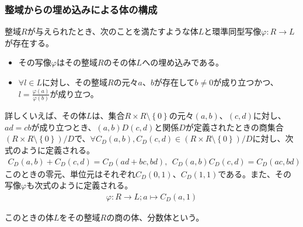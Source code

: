 \documentclass[dvipdfmx]{jsarticle}
\begin{document}
\subsubsection{整域からの埋め込みによる体の構成}%
\begin{thm}\label{3.3.2.33}
整域$R$が与えられたとき、次のことを満たすような体$L$と環準同型写像$\varphi:R \rightarrow L$が存在する。
\begin{itemize}
\item
  その写像$\varphi$はその整域$R$のその体$L$への埋め込みである。
\item
  $\forall l \in L$に対し、その整域$R$の元々$a$、$b$が存在して$b \neq 0$が成り立つかつ、$l = \frac{\varphi(a)}{\varphi(b)}$が成り立つ。
\end{itemize}\par
詳しくいえば、その体$L$は、集合$R \times R \setminus \left\{ 0 \right\}$の元々$\left( a,b \right)$、$\left( c,d \right)$に対し、$ad = cb$が成り立つとき、$\left( a,b \right)D\left( c,d \right)$と関係$D$が定義されたときの商集合${\left( R \times R \setminus \left\{ 0 \right\} \right)}/{D}$で、$\forall C_{D}(a,b),C_{D}(c,d) \in {\left( R \times R \setminus \left\{ 0 \right\} \right)}/{D}$に対し、次式のように定義される。
\begin{align*}
C_{D}(a,b) + C_{D}(c,d) = C_{D}(ad + bc,bd),\ \ C_{D}(a,b)C_{D}(c,d) = C_{D}(ac,bd)
\end{align*}
このときの零元、単位元はそれぞれ$C_{D}(0,1)$、$C_{D}(1,1)$である。また、その写像$\varphi$も次式のように定義される。
\begin{align*}
\varphi:R \rightarrow L;a \mapsto C_{D}(a,1)
\end{align*}
\end{thm}
\begin{dfn}
このときの体$L$をその整域$R$の商の体、分数体という。
\end{dfn}
\end{document}

